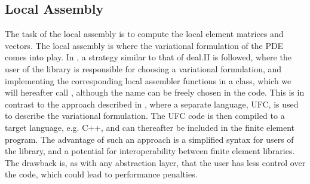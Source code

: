 

\subsection{Local Assembly}
The task of the local assembly is to compute the local element
matrices and vectors. The local assembly is where the variational
formulation of the PDE comes into play. In \hiflow{}, a strategy similar
to that of deal.II \cite{BHK07} is followed, where the user of the
library is responsible for choosing a variational formulation, and
implementing the corresponding local assembler functions in a class,
which we will hereafter call , although the
name can be freely chosen in the code. This is in contrast to the approach
described in \cite{AlnaesLoggEtAl2009a}, where a separate language,
UFC, is used to describe the variational formulation. The UFC code is
then compiled to a target language, e.g. C++, and can thereafter be
included in the finite element program. The advantage of such an approach
is a simplified syntax for users of the library, and a potential for
interoperability between finite element libraries. The drawback is, as
with any abstraction layer, that the user has less control over the
code, which could lead to performance penalties.

